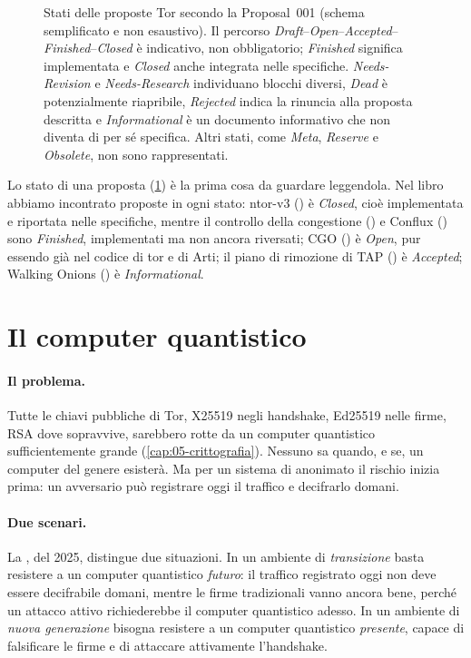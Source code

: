 \begin{figure}[htbp]
\centering

\caption{Stati delle proposte Tor secondo la Proposal~001 (schema semplificato e non esaustivo). Il percorso \emph{Draft}--\emph{Open}--\emph{Accepted}--\emph{Finished}--\emph{Closed} è indicativo, non obbligatorio; \emph{Finished} significa implementata e \emph{Closed} anche integrata nelle specifiche. \emph{Needs-Revision} e \emph{Needs-Research} individuano blocchi diversi, \emph{Dead} è potenzialmente riapribile, \emph{Rejected} indica la rinuncia alla proposta descritta e \emph{Informational} è un documento informativo che non diventa di per sé specifica. Altri stati, come \emph{Meta}, \emph{Reserve} e \emph{Obsolete}, non sono rappresentati.}
\label{fig:proposte}
\end{figure}

Lo stato di una proposta (\cref{fig:proposte}) è la prima cosa da guardare leggendola. Nel libro abbiamo incontrato proposte in ogni stato: ntor-v3 () è \emph{Closed}, cioè implementata e riportata nelle specifiche, mentre il controllo della congestione () e Conflux () sono \emph{Finished}, implementati ma non ancora riversati; CGO () è \emph{Open}, pur essendo già nel codice di tor e di Arti; il piano di rimozione di TAP () è \emph{Accepted}; Walking Onions () è \emph{Informational}.

\section{Il computer quantistico}\label{sec:fut-pq}

\paragraph{Il problema.} Tutte le chiavi pubbliche di Tor, X25519 negli handshake, Ed25519 nelle firme, RSA dove sopravvive, sarebbero rotte da un computer quantistico sufficientemente grande (\cref{cap:05-crittografia}). Nessuno sa quando, e se, un computer del genere esisterà. Ma per un sistema di anonimato il rischio inizia prima: un avversario può registrare oggi il traffico e decifrarlo domani.

\paragraph{Due scenari.} La , del 2025, distingue due situazioni. In un ambiente di \emph{transizione} basta resistere a un computer quantistico \emph{futuro}: il traffico registrato oggi non deve essere decifrabile domani, mentre le firme tradizionali vanno ancora bene, perché un attacco attivo richiederebbe il computer quantistico adesso. In un ambiente di \emph{nuova generazione} bisogna resistere a un computer quantistico \emph{presente}, capace di falsificare le firme e di attaccare attivamente l'handshake.

